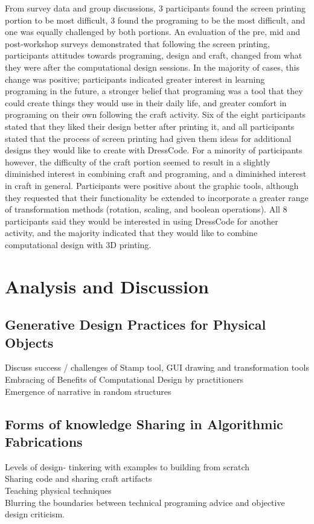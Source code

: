 \documentclass{sigchi}
\begin{document}
From survey data and group discussions, 3 participants found the screen printing portion to be most difficult, 3 found the programing to be the most difficult, and one was equally challenged by both portions. An evaluation of the pre, mid and post-workshop surveys demonstrated that following the screen printing, participants attitudes towards programing, design and craft, changed from what they were after the computational design sessions. In the majority of cases, this change was positive; participants indicated greater interest in learning programing in the future, a stronger belief that programing was a tool that they could create things they would use in their daily life, and greater comfort in programing on their own following the craft activity. Six of the eight participants stated that they liked their design better after printing it, and all participants stated that the process of screen printing had given them ideas for additional designs they would like to create with DressCode. For a minority of participants however, the difficulty of the craft portion seemed to result in a slightly diminished interest in combining craft and programing, and a diminished interest in craft in general. Participants were positive about the graphic tools, although they requested that their functionality be extended to incorporate a greater range of transformation methods (rotation, scaling, and boolean operations). All 8 participants said they would be interested in using DressCode for another activity, and the majority indicated that they would like to combine computational design with 3D printing.

\section{Analysis and Discussion}
\subsection{Generative Design Practices for Physical Objects}
Discuss success / challenges of Stamp tool, GUI drawing and transformation tools\\
Embracing of Benefits of Computational Design by practitioners\\
Emergence of narrative in random structures

\subsection{Forms of knowledge Sharing in Algorithmic Fabrications}
Levels of design- tinkering with examples to building from scratch\\
Sharing code and sharing craft artifacts\\
Teaching physical techniques\\
Blurring the boundaries between technical programing advice and objective design criticism.
\end{document}

